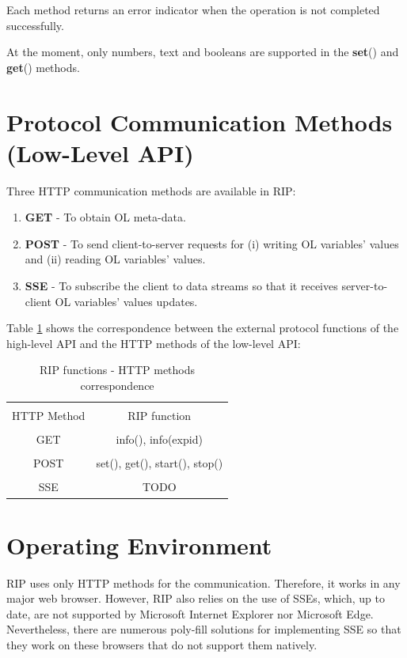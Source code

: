 Each method returns an error indicator when the operation is not completed successfully.

At the moment, only numbers, text and booleans are supported in the \textbf{set}() and \textbf{get}() methods.

\section{Protocol Communication Methods (Low-Level API)}
Three HTTP communication methods are available in RIP:

\begin{enumerate}
    \item \textbf{GET} - To obtain OL meta-data.
    \item \textbf{POST} - To send client-to-server requests for (i) writing OL variables' values and (ii) reading OL variables' values.
    \item \textbf{SSE} - To subscribe the client to data streams so that it receives server-to-client OL variables' values updates.
\end{enumerate}

Table \ref{tab:low-high-levels-correspondence} shows the correspondence between the external protocol functions of the high-level API and the HTTP methods of the low-level API:

\begin{table}[]
    \centering
    \begin{tabular}{|c|c|}\hline
         &  \\HTTP Method & RIP function \\\hline
         &  \\GET & info(), info(expid) \\\hline
         &  \\POST & set(), get(), start(), stop() \\\hline
         &  \\SSE & TODO \\\hline
    \end{tabular}
    \caption{RIP functions - HTTP methods correspondence}
    \label{tab:low-high-levels-correspondence}
\end{table}

\section{Operating Environment}
RIP uses only HTTP methods for the communication. Therefore, it works in any major web browser. However, RIP also relies on the use of SSEs, which, up to date, are not supported by Microsoft Internet Explorer nor Microsoft Edge. Nevertheless, there are numerous poly-fill solutions for implementing SSE so that they work on these browsers that do not support them natively.

